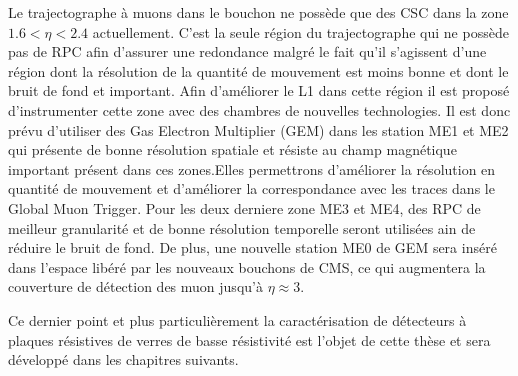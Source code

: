 \item Le trajectographe à muons dans le bouchon ne possède que des CSC dans la zone $1.6<\eta<2.4$ actuellement. C'est la seule région du trajectographe qui ne possède pas de RPC afin d'assurer une redondance malgré le fait qu'il s'agissent d'une région dont la résolution de la quantité de mouvement est moins bonne et dont le bruit de fond et important. Afin d'améliorer le L1 dans cette région il est proposé d'instrumenter cette zone avec des chambres de nouvelles technologies. Il est donc prévu d'utiliser des Gas Electron Multiplier (GEM) dans les station ME1 et ME2 qui présente de bonne résolution spatiale et résiste au champ magnétique important présent dans ces zones.Elles permettrons d'améliorer la résolution en quantité de mouvement et d'améliorer la correspondance avec les traces dans le Global Muon Trigger. Pour les deux derniere zone ME3 et ME4, des RPC de meilleur granularité et de bonne résolution temporelle seront utilisées ain de réduire le bruit de fond.  De plus, une nouvelle station ME0 de GEM sera inséré dans l'espace libéré par les nouveaux bouchons de CMS, ce qui augmentera la couverture de détection des muon jusqu'à $\eta\approx3$. 

Ce dernier point et plus particulièrement la caractérisation de détecteurs à plaques résistives de verres de basse résistivité est l'objet de cette thèse et sera développé dans les chapitres suivants.